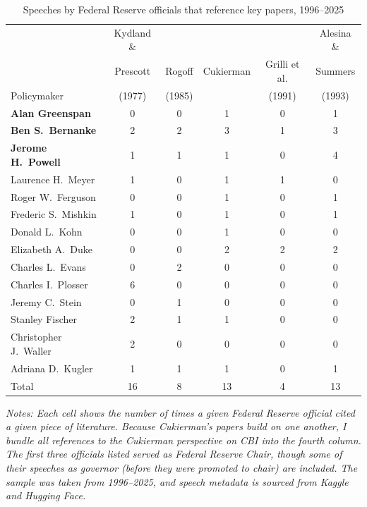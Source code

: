 \documentclass[12pt,a4paper]{article}
\begin{document}
\begin{doublespace}
\begin{singlespace}
\begin{table}[H]
\centering
\caption{Speeches by Federal Reserve officials that reference key papers, 1996--2025}
\label{tab:fed_cbi_citations}
\small
\begin{tabular}{l ccccc}
\toprule
 & Kydland \& &  &  & & Alesina \&  \\
 & Prescott & Rogoff & Cukierman & Grilli et al. & Summers \\
Policymaker & (1977) & (1985) &  & (1991) & (1993) \\
\midrule
\textbf{Alan Greenspan}    & 0 & 0 & 1 & 0 & 1 \\
\textbf{Ben S.\ Bernanke}  & 2 & 2 & 3 & 1 & 3 \\
\textbf{Jerome H.\ Powell} & 1 & 1 & 1 & 0 & 4 \\
\midrule
Laurence H.\ Meyer      & 1 & 0 & 1 & 1 & 0 \\
Roger W.\ Ferguson      & 0 & 0 & 1 & 0 & 1 \\
Frederic S.\ Mishkin    & 1 & 0 & 1 & 0 & 1 \\
Donald L.\ Kohn         & 0 & 0 & 1 & 0 & 0 \\
Elizabeth A.\ Duke      & 0 & 0 & 2 & 2 & 2 \\
Charles L.\ Evans       & 0 & 2 & 0 & 0 & 0 \\
Charles I.\ Plosser     & 6 & 0 & 0 & 0 & 0 \\
Jeremy C.\ Stein        & 0 & 1 & 0 & 0 & 0 \\
Stanley Fischer         & 2 & 1 & 1 & 0 & 0 \\
Christopher J.\ Waller  & 2 & 0 & 0 & 0 & 0 \\
Adriana D.\ Kugler      & 1 & 1 & 1 & 0 & 1 \\
\midrule
Total & 16 & 8 & 13 & 4 & 13 \\
\bottomrule
\end{tabular}
\smallskip
\begin{minipage}{\linewidth}
\footnotesize\textit{Notes: Each cell shows the number of times a given Federal Reserve official cited a given piece of literature. Because Cukierman's papers build on one another, I bundle all references to the Cukierman perspective on CBI into the fourth column. The first three officials listed served as Federal Reserve Chair, though some of their speeches as governor (before they were promoted to chair) are included. The sample was taken from 1996--2025, and speech metadata is sourced from Kaggle and Hugging Face.}
\end{minipage}
\end{table}
\end{singlespace}


\end{doublespace}
\end{document}
